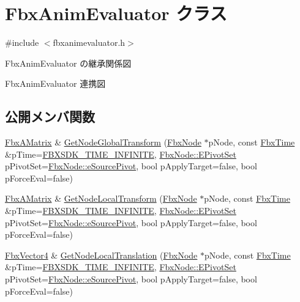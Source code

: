 \hypertarget{class_fbx_anim_evaluator}{}\section{Fbx\+Anim\+Evaluator クラス}
\label{class_fbx_anim_evaluator}


{\ttfamily \#include $<$fbxanimevaluator.\+h$>$}



Fbx\+Anim\+Evaluator の継承関係図


Fbx\+Anim\+Evaluator 連携図
\subsection*{公開メンバ関数}
\begin{DoxyCompactItemize}
\item 
\hyperlink{class_fbx_a_matrix}{Fbx\+A\+Matrix} \& \hyperlink{class_fbx_anim_evaluator_a40d669964d698df2551ee3571c211312}{Get\+Node\+Global\+Transform} (\hyperlink{class_fbx_node}{Fbx\+Node} $\ast$p\+Node, const \hyperlink{class_fbx_time}{Fbx\+Time} \&p\+Time=\hyperlink{fbxtime_8h_a1e6db3fe0f84f0b7daa775739f93526f}{F\+B\+X\+S\+D\+K\+\_\+\+T\+I\+M\+E\+\_\+\+I\+N\+F\+I\+N\+I\+TE}, \hyperlink{class_fbx_node_ae62b7311ac4727654cdf1ebd5cbf7343}{Fbx\+Node\+::\+E\+Pivot\+Set} p\+Pivot\+Set=\hyperlink{class_fbx_node_ae62b7311ac4727654cdf1ebd5cbf7343ae8ed37a5c7e41f8d1cec9d3fa8424b69}{Fbx\+Node\+::e\+Source\+Pivot}, bool p\+Apply\+Target=false, bool p\+Force\+Eval=false)
\item 
\hyperlink{class_fbx_a_matrix}{Fbx\+A\+Matrix} \& \hyperlink{class_fbx_anim_evaluator_a3b451f7466d6730816bf56a3b5441379}{Get\+Node\+Local\+Transform} (\hyperlink{class_fbx_node}{Fbx\+Node} $\ast$p\+Node, const \hyperlink{class_fbx_time}{Fbx\+Time} \&p\+Time=\hyperlink{fbxtime_8h_a1e6db3fe0f84f0b7daa775739f93526f}{F\+B\+X\+S\+D\+K\+\_\+\+T\+I\+M\+E\+\_\+\+I\+N\+F\+I\+N\+I\+TE}, \hyperlink{class_fbx_node_ae62b7311ac4727654cdf1ebd5cbf7343}{Fbx\+Node\+::\+E\+Pivot\+Set} p\+Pivot\+Set=\hyperlink{class_fbx_node_ae62b7311ac4727654cdf1ebd5cbf7343ae8ed37a5c7e41f8d1cec9d3fa8424b69}{Fbx\+Node\+::e\+Source\+Pivot}, bool p\+Apply\+Target=false, bool p\+Force\+Eval=false)
\item 
\hyperlink{class_fbx_vector4}{Fbx\+Vector4} \& \hyperlink{class_fbx_anim_evaluator_a3f430f456d4f093a3c8682a874ec8145}{Get\+Node\+Local\+Translation} (\hyperlink{class_fbx_node}{Fbx\+Node} $\ast$p\+Node, const \hyperlink{class_fbx_time}{Fbx\+Time} \&p\+Time=\hyperlink{fbxtime_8h_a1e6db3fe0f84f0b7daa775739f93526f}{F\+B\+X\+S\+D\+K\+\_\+\+T\+I\+M\+E\+\_\+\+I\+N\+F\+I\+N\+I\+TE}, \hyperlink{class_fbx_node_ae62b7311ac4727654cdf1ebd5cbf7343}{Fbx\+Node\+::\+E\+Pivot\+Set} p\+Pivot\+Set=\hyperlink{class_fbx_node_ae62b7311ac4727654cdf1ebd5cbf7343ae8ed37a5c7e41f8d1cec9d3fa8424b69}{Fbx\+Node\+::e\+Source\+Pivot}, bool p\+Apply\+Target=false, bool p\+Force\+Eval=false)

\end{DoxyCompactItemize}
